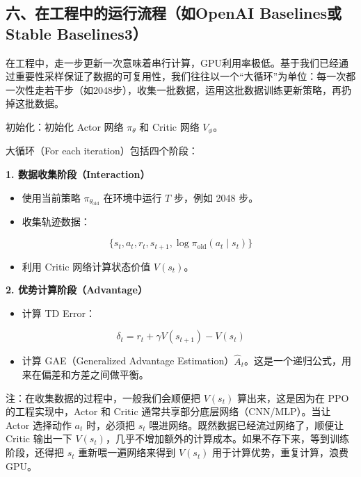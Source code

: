 \hypertarget{ux516dux5728ux5de5ux7a0bux4e2dux7684ux8fd0ux884cux6d41ux7a0bux5982openai-baselinesux6216stable-baselines3}{%
\subsection{六、在工程中的运行流程（如OpenAI Baselines或Stable Baselines3）}\label{ux516dux5728ux5de5ux7a0bux4e2dux7684ux8fd0ux884cux6d41ux7a0bux5982openai-baselinesux6216stable-baselines3}}

在工程中，走一步更新一次意味着串行计算，GPU利用率极低。基于我们已经通过重要性采样保证了数据的可复用性，我们往往以一个``大循环''为单位：每一次都一次性走若干步（如2048步），收集一批数据，运用这批数据训练更新策略，再扔掉这批数据。

初始化：初始化 Actor 网络 \(\pi_\theta\) 和 Critic 网络 \(V_\phi\)。

大循环（For each iteration）包括四个阶段：

\textbf{1. 数据收集阶段（Interaction）}

\begin{itemize}
\tightlist
\item
  使用当前策略 \(\pi_{\theta_{\mathrm{old}}}\) 在环境中运行 \(T\) 步，例如 2048 步。
\item
  收集轨迹数据：
\end{itemize}

\[
\{s_t,a_t,r_t,s_{t+1},\log\pi_{\mathrm{old}}(a_t\mid s_t)\}
\]

\begin{itemize}
\tightlist
\item
  利用 Critic 网络计算状态价值 \(V(s_t)\)。
\end{itemize}

\textbf{2. 优势计算阶段（Advantage）}

\begin{itemize}
\tightlist
\item
  计算 TD Error：
\end{itemize}

\[
\delta_t=r_t+\gamma V(s_{t+1})-V(s_t)
\]

\begin{itemize}
\tightlist
\item
  计算 GAE（Generalized Advantage Estimation）\(\hat{A}_t\)。这是一个递归公式，用来在偏差和方差之间做平衡。
\end{itemize}

注：在收集数据的过程中，一般我们会顺便把 \(V(s_t)\) 算出来，这是因为在 PPO 的工程实现中，Actor 和 Critic 通常共享部分底层网络（CNN/MLP）。当让 Actor 选择动作 \(a_t\) 时，必须把 \(s_t\) 喂进网络。既然数据已经流过网络了，顺便让 Critic 输出一下 \(V(s_t)\)，几乎不增加额外的计算成本。如果不存下来，等到训练阶段，还得把 \(s_t\) 重新喂一遍网络来得到 \(V(s_t)\) 用于计算优势，重复计算，浪费 GPU。

